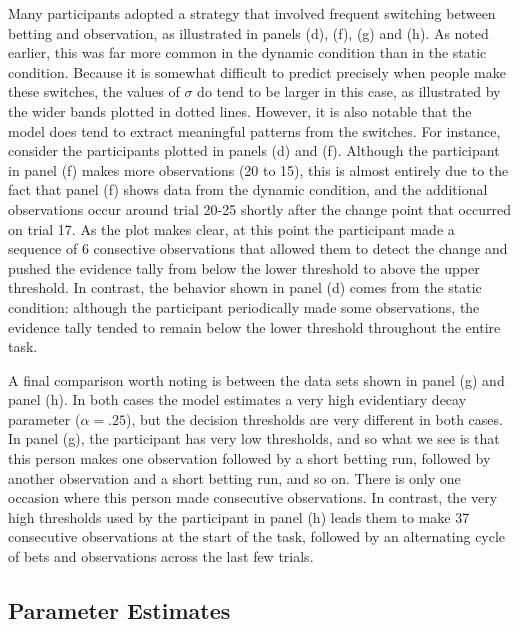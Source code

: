 \documentclass[authoryear]{elsarticle}
\newcommand{\subsectionX}[1]{\subsection{#1}}
\begin{document}
Many participants adopted a strategy that involved frequent switching between betting and observation, as illustrated in panels (d), (f), (g) and (h). As noted earlier, this was far more common in the dynamic condition than in the static condition. Because it is somewhat difficult to predict precisely when people make these switches, the values of $\sigma$ do tend to be larger in this case, as illustrated by the wider bands plotted in dotted lines. However, it is also notable that the model does tend to extract meaningful patterns from the switches. For instance, consider the participants plotted in panels (d) and (f). Although the participant in panel (f) makes more observations (20 to 15), this is almost entirely due to the fact that panel (f) shows data from the dynamic condition, and the additional observations occur around trial 20-25 shortly after the change point that occurred on trial 17. As the plot makes clear, at this point the participant made a sequence of 6 consective observations that allowed them to detect the change and pushed the evidence tally from below the lower threshold to above the upper threshold. In contrast, the behavior shown in panel (d) comes from the static condition: although the participant periodically made some observations, the evidence tally tended to remain below the lower threshold throughout the entire task.

A final comparison worth noting is between the data sets shown in panel (g) and panel (h). In both cases the model estimates a very high evidentiary decay parameter ($\alpha = .25$), but the decision thresholds are very different in both cases. In panel (g), the participant has very low thresholds, and so what we see is that this person makes one observation followed by a short betting run, followed by another observation and a short betting run, and so on. There is only one occasion where this person made consecutive observations. In contrast, the very high thresholds used by the participant in panel (h) leads them to make 37 consecutive observations at the start of the task, followed by an alternating cycle of bets and observations across the last few trials.


\subsectionX{Parameter Estimates}
\end{document}
